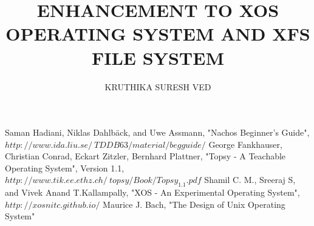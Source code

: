 \documentclass[modernstyle,12pt]{thesis}
\title{\uppercase{Enhancement to XOS Operating System and XFS file system}}
\author{\uppercase{KRUTHIKA SURESH VED}} {\uppercase{B110300CS}} {\uppercase{SIKHA V MANOJ}} {\uppercase{B110572CS}} {\uppercase{SONIA V MATHEW}} {\uppercase{B110495CS}}
\begin{document}














\nocite{*}      %


\begin{thebibliography}{30}
Saman Hadiani, Niklas Dahlbäck, and Uwe Assmann, "Nachos Beginner's Guide", \texttt{$http://www.ida.liu.se/~TDDB63/material/begguide/$}
George Fankhauser, Christian Conrad, Eckart Zitzler, Bernhard Plattner, "Topsy - A Teachable Operating System", Version 1.1, \texttt{$http://www.tik.ee.ethz.ch/~topsy/Book/Topsy_1.1.pdf$}
Shamil C. M., Sreeraj S, and Vivek Anand T.Kallampally, "XOS - An Experimental Operating System", \texttt{$http://xosnitc.github.io/$}
Maurice J. Bach, "The Design of Unix Operating System"
\end{thebibliography}


\appendix   %


\end{document}
